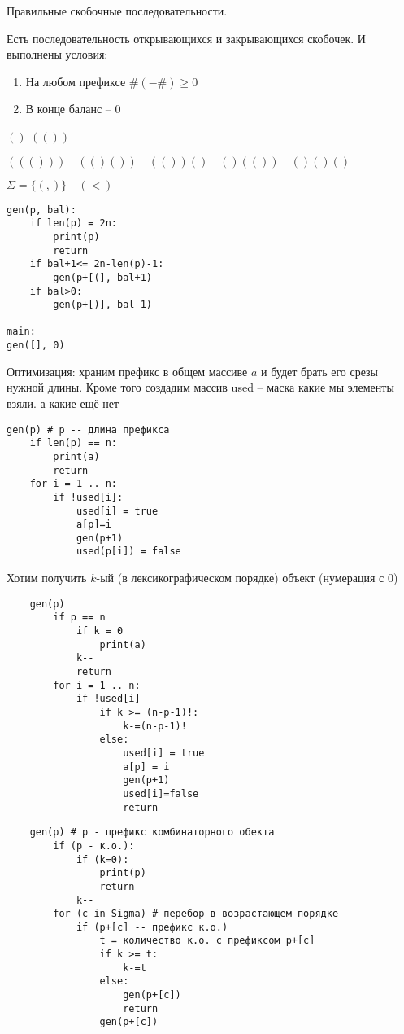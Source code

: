 \documentclass{book}
\theoremstyle{definition}
\begin{document}
Правильные скобочные последовательности.

Есть последовательность открывающихся и закрывающихся скобочек. И выполнены условия:
\begin{enumerate}
    \item На любом префиксе $\#( - \#)\geqslant 0$
    \item В конце баланс -- 0
\end{enumerate}

$\left(  \right) $
$(\left(  \right) )$ 

$((( )))\quad (( )( ))\quad (( ))\left(  \right) \quad ( )(( ))\quad \left(  \right) \left(  \right) \left(  \right) $ 

$\Sigma = \{(,)\}\quad (<)$

\begin{verbatim}
gen(p, bal):    
    if len(p) = 2n:
        print(p)
        return
    if bal+1<= 2n-len(p)-1:
        gen(p+[(], bal+1)
    if bal>0:
        gen(p+[)], bal-1)

main:
gen([], 0)
\end{verbatim}

Оптимизация: храним префикс в общем массиве $a$ и будет брать его срезы нужной длины. Кроме того создадим массив used -- маска какие мы элементы взяли. а какие ещё нет

\begin{verbatim}
gen(p) # p -- длина префикса
    if len(p) == n:
        print(a)
        return
    for i = 1 .. n:
        if !used[i]:
            used[i] = true
            a[p]=i
            gen(p+1)
            used(p[i]) = false
\end{verbatim}

\begin{problem}
    Хотим получить $k$-ый (в лексикографическом порядке) объект (нумерация с 0)
\end{problem}

\begin{verbatim}
    gen(p)
        if p == n
            if k = 0
                print(a)
            k--
            return
        for i = 1 .. n:
            if !used[i]
                if k >= (n-p-1)!:
                    k-=(n-p-1)!
                else:
                    used[i] = true
                    a[p] = i
                    gen(p+1)
                    used[i]=false
                    return
\end{verbatim}

\begin{verbatim}
    gen(p) # p - префикс комбинаторного обекта
        if (p - к.о.):
            if (k=0):
                print(p)
                return
            k--
        for (c in Sigma) # перебор в возрастающем порядке
            if (p+[c] -- префикс к.о.)
                t = количество к.о. с префиксом p+[c]
                if k >= t:
                    k-=t
                else:
                    gen(p+[c])
                    return
                gen(p+[c])
\end{verbatim}
\end{document}

